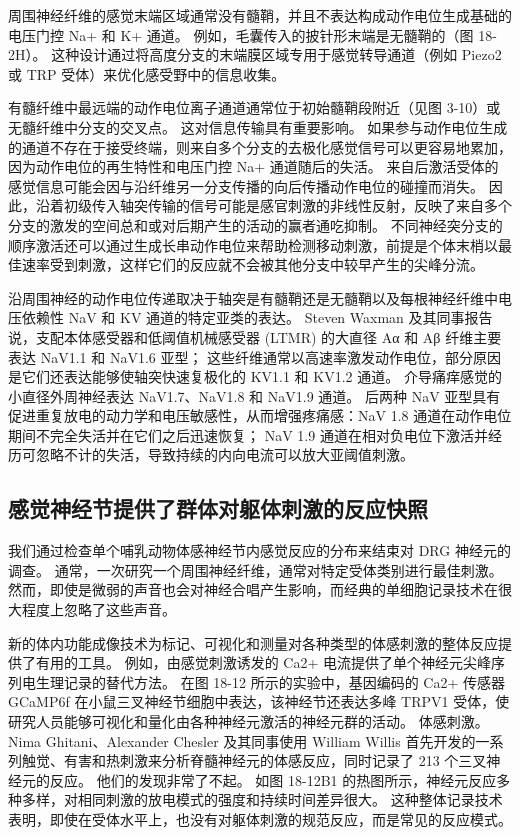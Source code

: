 周围神经纤维的感觉末端区域通常没有髓鞘，并且不表达构成动作电位生成基础的电压门控 Na+ 和 K+ 通道。 例如，毛囊传入的披针形末端是无髓鞘的（图 18-2H）。 这种设计通过将高度分支的末端膜区域专用于感觉转导通道（例如 Piezo2 或 TRP 受体）来优化感受野中的信息收集。

有髓纤维中最远端的动作电位离子通道通常位于初始髓鞘段附近（见图 3-10）或无髓纤维中分支的交叉点。 这对信息传输具有重要影响。 如果参与动作电位生成的通道不存在于接受终端，则来自多个分支的去极化感觉信号可以更容易地累加，因为动作电位的再生特性和电压门控 Na+ 通道随后的失活。 来自后激活受体的感觉信息可能会因与沿纤维另一分支传播的向后传播动作电位的碰撞而消失。 因此，沿着初级传入轴突传输的信号可能是感官刺激的非线性反射，反映了来自多个分支的激发的空间总和或对后期产生的活动的赢者通吃抑制。 不同神经突分支的顺序激活还可以通过生成长串动作电位来帮助检测移动刺激，前提是个体末梢以最佳速率受到刺激，这样它们的反应就不会被其他分支中较早产生的尖峰分流。

沿周围神经的动作电位传递取决于轴突是有髓鞘还是无髓鞘以及每根神经纤维中电压依赖性 NaV 和 KV 通道的特定亚类的表达。 Steven Waxman 及其同事报告说，支配本体感受器和低阈值机械感受器 (LTMR) 的大直径 Aα 和 Aβ 纤维主要表达 NaV1.1 和 NaV1.6 亚型； 这些纤维通常以高速率激发动作电位，部分原因是它们还表达能够使轴突快速复极化的 KV1.1 和 KV1.2 通道。 介导痛痒感觉的小直径外周神经表达 NaV1.7、NaV1.8 和 NaV1.9 通道。 后两种 NaV 亚型具有促进重复放电的动力学和电压敏感性，从而增强疼痛感：NaV 1.8 通道在动作电位期间不完全失活并在它们之后迅速恢复； NaV 1.9 通道在相对负电位下激活并经历可忽略不计的失活，导致持续的内向电流可以放大亚阈值刺激。

\subsection{感觉神经节提供了群体对躯体刺激的反应快照}
我们通过检查单个哺乳动物体感神经节内感觉反应的分布来结束对 DRG 神经元的调查。 通常，一次研究一个周围神经纤维，通常对特定受体类别进行最佳刺激。 然而，即使是微弱的声音也会对神经合唱产生影响，而经典的单细胞记录技术在很大程度上忽略了这些声音。

新的体内功能成像技术为标记、可视化和测量对各种类型的体感刺激的整体反应提供了有用的工具。 例如，由感觉刺激诱发的 Ca2+ 电流提供了单个神经元尖峰序列电生理记录的替代方法。 在图 18-12 所示的实验中，基因编码的 Ca2+ 传感器 GCaMP6f 在小鼠三叉神经节细胞中表达，该神经节还表达多峰 TRPV1 受体，使研究人员能够可视化和量化由各种神经元激活的神经元群的活动。 体感刺激。 Nima Ghitani、Alexander Chesler 及其同事使用 William Willis 首先开发的一系列触觉、有害和热刺激来分析脊髓神经元的体感反应，同时记录了 213 个三叉神经元的反应。 他们的发现非常了不起。 如图 18-12B1 的热图所示，神经元反应多种多样，对相同刺激的放电模式的强度和持续时间差异很大。 这种整体记录技术表明，即使在受体水平上，也没有对躯体刺激的规范反应，而是常见的反应模式。

